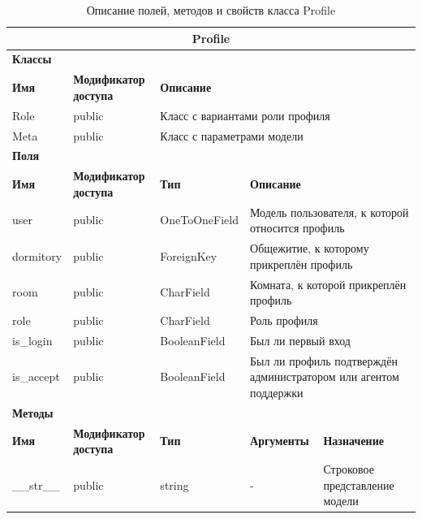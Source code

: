 \documentclass{../includes/TechDoc}
\begin{document}
    \begin{table}[ht]
        \caption{\label{tab:class-Profile-table}Описание полей, методов и свойств класса Profile}
        \centering
        \begin{tabular}{|p{3.2cm}|p{3cm}|p{2.9cm}|p{2.9cm}|p{4cm}|}
            \hline
            \multicolumn{5}{|c|}{Profile} \\ \hline
            \multicolumn{5}{|l|}{\textbf{Классы}} \\ \hline
            \textbf{Имя} & \textbf{Модификатор доступа} & \multicolumn{3}{p{9.8cm}|}{\textbf{Описание}} \\ \hline
            Role & public & \multicolumn{3}{p{9.8cm}|}{Класс с вариантами роли профиля} \\ \hline
            Meta & public & \multicolumn{3}{p{9.8cm}|}{Класс с параметрами модели} \\ \hline
            \multicolumn{5}{|l|}{\textbf{Поля}} \\ \hline
            \textbf{Имя} & \textbf{Модификатор доступа} & \textbf{Тип} & \multicolumn{2}{p{6.9cm}|}{\textbf{Описание}} \\ \hline
            user & public & OneToOneField & \multicolumn{2}{p{6.9cm}|}{Модель пользователя, к которой относится профиль} \\ \hline
            dormitory & public & ForeignKey & \multicolumn{2}{p{6.9cm}|}{Общежитие, к которому прикреплён профиль} \\ \hline
            room & public & CharField & \multicolumn{2}{p{6.9cm}|}{Комната, к которой прикреплён профиль} \\ \hline
            role & public & CharField & \multicolumn{2}{p{6.9cm}|}{Роль профиля} \\ \hline
            is\_login & public & BooleanField & \multicolumn{2}{p{6.9cm}|}{Был ли первый вход} \\ \hline
            is\_accept & public & BooleanField & \multicolumn{2}{p{6.9cm}|}{Был ли профиль подтверждён администратором или агентом поддержки} \\ \hline
            \multicolumn{5}{|l|}{\textbf{Методы}} \\ \hline
            \textbf{Имя} & \textbf{Модификатор доступа} & \textbf{Тип} & \textbf{Аргументы} & \textbf{Назначение} \\ \hline
            \_\_str\_\_ & public & string & - & Строковое представление модели \\ \hline
        \end{tabular}
    \end{table}
\end{document}
